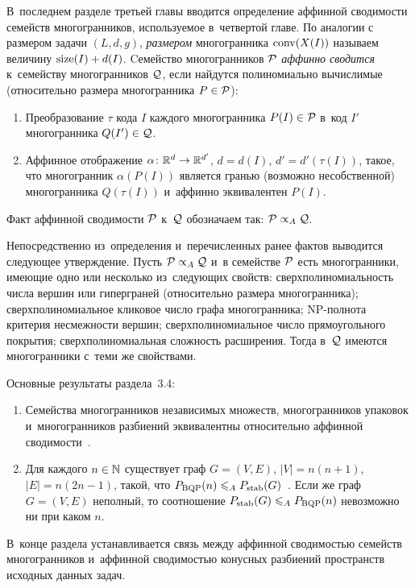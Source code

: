 В~последнем разделе третьей главы вводится определение аффинной сводимости семейств многогранников, используемое в~четвертой главе.
По аналогии с размером задачи $(L,d,g)$, \emph{размером} многогранника $\operatorname{conv}(X(I))$ называем величину $\operatorname{size}(I) + d(I)$.
Cемейство многогранников ${\mathcal P}$ \emph{аффинно сводится} к~семейству многогранников ${\mathcal Q}$, если найдутся полиномиально вычислимые (относительно размера многогранника $P\in {\mathcal P}$):
\begin{enumerate}
	\item 
	Преобразование $\tau$ кода $I$ каждого многогранника $P(I)\in {\mathcal P}$ в~код $I'$ многогранника $Q(I') \in {\mathcal Q}$.
	\item 
	Аффинное отображение \(\alpha\colon \mathbb{R}^d \to \mathbb{R}^{d'}\), $d = d(I)$, $d' = d'(\tau(I))$,
	такое, что многогранник $\alpha(P(I))$ является гранью (возможно несобственной) многогранника $Q(\tau(I))$ и~аффинно эквивалентен $P(I)$.
\end{enumerate}
Факт аффинной сводимости ${\mathcal P}$ к~${\mathcal Q}$ обозначаем так: ${\mathcal P} \propto_A {\mathcal Q}$.  

Непосредственно из~определения и~перечисленных ранее фактов выводится следующее утверждение.
Пусть ${\mathcal P} \propto_A {\mathcal Q}$ и~в семействе ${\mathcal P}$ есть многогранники, имеющие одно или несколько из~следующих свойств:
сверхполиномиальность числа вершин или гиперграней (относительно размера многогранника); сверхполиномиальное кликовое число графа многогранника; NP-полнота критерия несмежности вершин; сверхполиномиальное число прямоугольного покрытия; сверхполиномиальная сложность расширения.
Тогда в~${\mathcal Q}$ имеются многогранники с~теми же свойствами.

Основные результаты раздела~3.4:
\begin{enumerate}
\item 
Семейства многогранников независимых множеств, многогранников упаковок и~многогранников разбиений эквивалентны относительно аффинной сводимости~.
\item
Для каждого $n\in \mathbb{N}$ существует граф $G = (V,E)$, $|V| = n(n+1)$, $|E| = n(2n-1)$, такой, что $P_{\textup{BQP}}(n) \leqslant_A P_{\textup{stab}}(G)$~.
Если же граф $G=(V,E)$ неполный, то соотношение $P_{\textup{stab}}(G) \leqslant_A P_{\textup{BQP}}(n)$ невозможно ни при каком $n$.
\end{enumerate}
В~конце раздела устанавливается связь между аффинной сводимостью семейств многогранников и~аффинной сводимостью конусных разбиений пространств исходных данных задач. 


